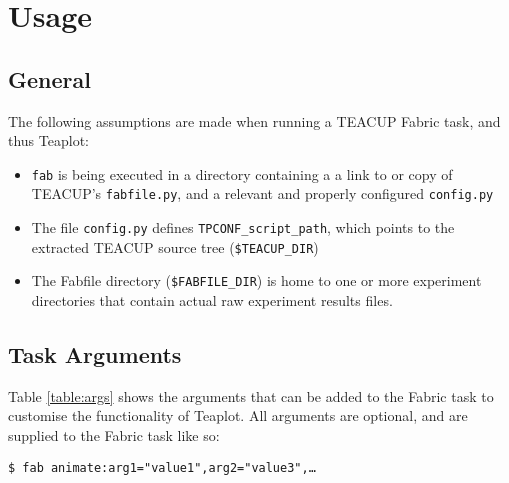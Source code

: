 \documentclass[a4paper,twocolumn,english,11pt, a4paper, conference]{IEEEtran}
\newcommand{\sh}[2]{{\small \texttt{#1 #2}}}
\begin{document}
\section{Usage}
\label{sect:usage}
\subsection{General}
The following assumptions are made when running a TEACUP Fabric task, and thus Teaplot:

\begin{itemize}
	\item \texttt{fab} is being executed in a directory containing a a link to or copy of TEACUP's \texttt{fabfile.py}, and a relevant and properly configured \texttt{config.py}
	\item The file \texttt{config.py} defines \texttt{TPCONF\_script\_path}, which points to the extracted TEACUP source tree (\texttt{\$TEACUP\_DIR})
	\item The Fabfile directory (\texttt{\$FABFILE\_DIR}) is home to one or more experiment directories that contain actual raw experiment results files. 
\end{itemize}
\subsection{Task Arguments}
Table \ref{table:args} shows the arguments that can be added to the Fabric task to customise the functionality of Teaplot. All arguments are optional, and are supplied to the Fabric task like so:

\sh{\$}{fab animate:arg1="value1",arg2="value3",…}
\end{document}
